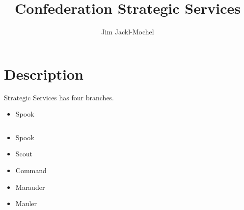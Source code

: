 \documentclass{article}
\begin{document}
\title{Confederation Strategic Services}
\author{Jim Jackl-Mochel}
\maketitle
\section{Description}

Strategic Services has four branches.

\begin{itemize}
	\item Spook
\end{itemize}

\begin{verbatim}
\end{verbatim}

\begin{itemize}
	\item Spook
	\item Scout
	\item Command
	\item Marauder
	\item Mauler
\end{itemize}
\end{document}
